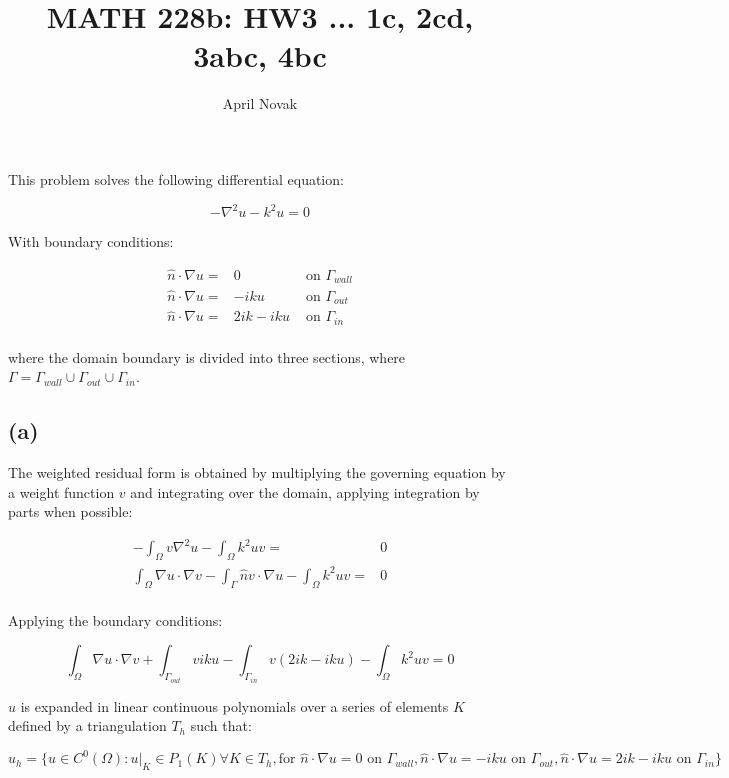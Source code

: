 \documentclass[10pt]{article}
\newcommand{\beq}{\begin{equation}}
\newcommand{\eeq}{\end{equation}}
\newcommand{\beqa}{\begin{equation}\begin{aligned}}
\newcommand{\eeqa}{\end{aligned}\end{equation}}
\begin{document}
\title{MATH 228b: HW3 ... 1c, 2cd, 3abc, 4bc}
\author{April Novak}

\maketitle

\section{}

This problem solves the following differential equation:

\beq
\label{eq:prob}
-\nabla^2 u-k^2u=0
\eeq

With boundary conditions:

\beqa
\label{eq:BCs}
\hat{n}\cdot\nabla u=&0 & \textrm{ on } \Gamma_{wall}\\
\hat{n}\cdot\nabla u=&-iku & \textrm{ on } \Gamma_{out}\\
\hat{n}\cdot\nabla u=&2ik-iku & \textrm{ on } \Gamma_{in}\\
\eeqa

where the domain boundary is divided into three sections, where \(\Gamma=\Gamma_{wall}\cup\Gamma_{out}\cup\Gamma_{in}\). 

\subsection{(a)}

The weighted residual form is obtained by multiplying the governing equation by a weight function \(v\) and integrating over the domain, applying integration by parts when possible:

\beqa
-\int_{\Omega}v\nabla^2 u-\int_{\Omega}k^2uv=& 0\\
\int_{\Omega}\nabla u\cdot\nabla v-\int_{\Gamma}\hat{n}v\cdot\nabla u-\int_{\Omega}k^2uv=&0\\
\eeqa

Applying the boundary conditions:

\beq
\int_{\Omega}\nabla u\cdot\nabla v+\int_{\Gamma_{out}}viku-\int_{\Gamma_{in}}v(2ik-iku)-\int_{\Omega}k^2uv=0
\eeq

\(u\) is expanded in linear continuous polynomials over a series of elements \(K\) defined by a triangulation \(T_h\) such that:

\beq
u_h=\{u\in C^0(\Omega):u\rvert_K\in P_1(K)\forall K\in T_h, \textrm{for } \hat{n}\cdot\nabla u=0 \textrm{ on } \Gamma_{wall}, \hat{n}\cdot\nabla u=-iku \textrm{ on } \Gamma_{out}, \hat{n}\cdot\nabla u=2ik-iku \textrm{ on } \Gamma_{in}\}
\eeq
\end{document}
